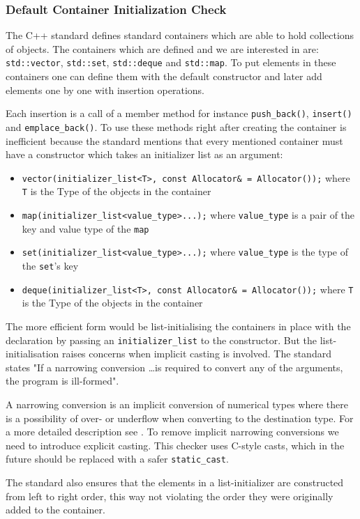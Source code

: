 \subsubsection{Default Container Initialization Check}
\par The C++ standard defines standard containers which are able to hold collections of objects. The containers which are defined and we are interested in are: \verb|std::vector|, \verb|std::set|, \verb|std::deque| and \verb|std::map|. To put elements in these containers one can define them with the default constructor and later add elements one by one with insertion operations. \medskip
\par Each insertion is a call of a member method for instance \verb|push_back()|, \verb|insert()| and \verb|emplace_back()|. To use these methods right after creating the container is inefficient because the standard mentions that every mentioned container must have a constructor which takes an initializer list as an argument:
\begin{itemize}
	\item \verb|vector(initializer_list<T>, const Allocator& = Allocator());| where \verb|T| is the Type of the objects in the container \cite[\S23.3.6.2]{cpp_standard}
	\item \verb|map(initializer_list<value_type>...);| where \verb|value_type| is a pair of the key and value type of the \verb|map| \cite[\S23.4.4.2]{cpp_standard}
	\item \verb|set(initializer_list<value_type>...);| where \verb|value_type| is the type of the \verb|set|'s key \cite[\S23.4.6.2]{cpp_standard}
	\item \verb|deque(initializer_list<T>, const Allocator& = Allocator());| where \verb|T| is the Type of the objects in the container\cite[\S23.3.3.2]{cpp_standard}
\end{itemize}
\par The more efficient form would be list-initialising the containers in place with the declaration by passing an \verb|initializer_list| to the constructor. But the list-initialisation raises concerns when implicit casting is involved. The standard states "If a narrowing conversion \dots is required to convert any of the arguments, the program is ill-formed"\cite[\S8.5.4 3.6]{cpp_standard}. \medskip
\par A narrowing conversion is an implicit conversion of numerical types where there is a possibility of over- or underflow when converting to the destination type. For a more detailed description see \cite[\S8.5.4 7]{cpp_standard}. To remove implicit narrowing conversions we need to introduce explicit casting. This checker uses C-style casts, which in the future should be replaced with a safer \verb|static_cast|. \medskip
\par The standard also ensures that the elements in a list-initializer are constructed from left to right order\cite[\S8.5.4.4]{cpp_standard}, this way not violating the order they were originally added to the container.
